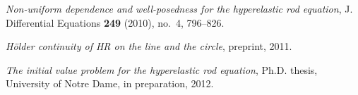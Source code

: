 \documentclass[12pt]{article}
\begin{document}
\large
\begin{thebibliography}{1}

\emph{Non-uniform dependence and well-posedness for the
  hyperelastic rod equation}, J. Differential Equations \textbf{249} (2010),
  no.~4, 796--826.

\emph{H\"older continuity of HR on the line and the circle}, preprint,
  2011.

\emph{The initial value problem for the hyperelastic rod equation},
  Ph.D. thesis, University of Notre Dame, in preparation, 2012.

\end{thebibliography}
        
        
\end{document}
